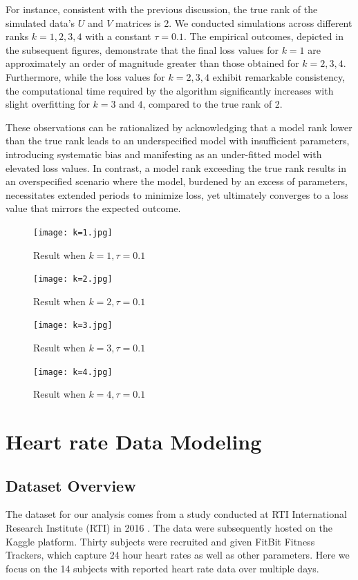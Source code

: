 \documentclass{article}
\begin{document}
For instance, consistent with the previous discussion, the true rank of the simulated data's $U$ and $V$ matrices is 2. We conducted simulations across different ranks $k = 1, 2, 3, 4$ with a constant $\tau = 0.1$. The empirical outcomes, depicted in the subsequent figures, demonstrate that the final loss values for $k = 1$ are approximately an order of magnitude greater than those obtained for $k = 2, 3, 4$. Furthermore, while the loss values for $k = 2, 3, 4$ exhibit remarkable consistency, the computational time required by the algorithm significantly increases with slight overfitting for $k = 3$ and $4$, compared to the true rank of 2.

These observations can be rationalized by acknowledging that a model rank lower than the true rank leads to an underspecified model with insufficient parameters, introducing systematic bias and manifesting as an under-fitted model with elevated loss values. In contrast, a model rank exceeding the true rank results in an overspecified scenario where the model, burdened by an excess of parameters, necessitates extended periods to minimize loss, yet ultimately converges to a loss value that mirrors the expected outcome.

\begin{figure}[h]
    \centering
    \texttt{[image: k=1.jpg]}
    \caption{Result when $k = 1, \tau=0.1$}
    \label{k=1}
\end{figure}
\begin{figure}[h]
    \centering
    \texttt{[image: k=2.jpg]}
    \caption{Result when $k = 2, \tau=0.1$}
    \label{k=2}
\end{figure}
\begin{figure}[h]
    \centering
    \texttt{[image: k=3.jpg]}
    \caption{Result when $k = 3, \tau=0.1$}
    \label{k=3}
\end{figure}
\begin{figure}[h]
    \centering
    \texttt{[image: k=4.jpg]}
    \caption{Result when $k = 4, \tau=0.1$}
    \label{k=4}
\end{figure}

\FloatBarrier
\section{Heart rate Data Modeling}

\subsection{Dataset Overview}
The dataset for our analysis comes from a study conducted at RTI International Research Institute (RTI) in 2016 \cite{furberg_2016_53894}.  The data were subsequently hosted on the Kaggle platform.   Thirty subjects were recruited and given FitBit Fitness Trackers, which capture 24 hour heart rates as well as other parameters.  Here we focus on the 14 subjects with reported heart rate data over multiple days.
\end{document}

